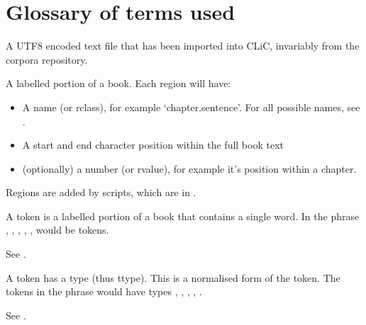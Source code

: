 \documentclass[letterpaper,10pt,english]{sphinxmanual}
\begin{document}
\chapter{Glossary of terms used}
\label{\detokenize{glossary:glossary-of-terms-used}}\label{\detokenize{glossary::doc}}\begin{description}
\sphinxAtStartPar
A UTF\sphinxhyphen{}8 encoded text file that has been imported into CLiC, invariably from the corpora repository.

\sphinxAtStartPar
A labelled portion of a book. Each region will have:
\begin{itemize}
\item {} 
\sphinxAtStartPar
A name (or rclass), for example ‘chapter.sentence’. For all possible names, see .

\item {} 
\sphinxAtStartPar
A start and end character position within the full book text

\item {} 
\sphinxAtStartPar
(optionally) a number (or rvalue), for example it’s position within a chapter.

\end{itemize}

\sphinxAtStartPar
Regions are added by  scripts, which are in .

\sphinxAtStartPar
A token is a labelled portion of a book that contains a single word.
In the phrase , , , , ,  would be tokens.

\sphinxAtStartPar
See .

\sphinxAtStartPar
A token has a type (thus ttype). This is a normalised form of the token.
The tokens in the phrase  would have types , , , , .

\sphinxAtStartPar
See .

\end{description}
\end{document}
